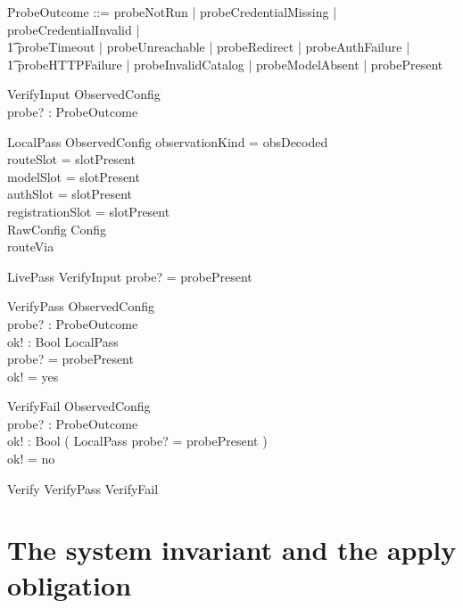 \documentclass{article}
\begin{document}
\begin{zed}
	ProbeOutcome ::= probeNotRun | probeCredentialMissing | probeCredentialInvalid | \\
	\t1 probeTimeout | probeUnreachable | probeRedirect | probeAuthFailure | \\
	\t1 probeHTTPFailure | probeInvalidCatalog | probeModelAbsent | probePresent
\end{zed}

\begin{schema}{VerifyInput}
	ObservedConfig \\
	probe? : ProbeOutcome
\end{schema}

\begin{schema}{LocalPass}
	ObservedConfig
	\where
	observationKind = obsDecoded \\
	routeSlot = slotPresent \\
	modelSlot = slotPresent \\
	authSlot = slotPresent \\
	registrationSlot = slotPresent \\
	\theta RawConfig \in Config \\
	\dom routeVia \neq \emptyset
\end{schema}

\begin{schema}{LivePass}
	VerifyInput
	\where
	probe? = probePresent
\end{schema}

\begin{schema}{VerifyPass}
	\Xi ObservedConfig \\
	probe? : ProbeOutcome \\
	ok! : Bool
	\where
	LocalPass \\
	probe? = probePresent \\
	ok! = yes
\end{schema}

\begin{schema}{VerifyFail}
	\Xi ObservedConfig \\
	probe? : ProbeOutcome \\
	ok! : Bool
	\where
	\lnot ( LocalPass \land probe? = probePresent ) \\
	ok! = no
\end{schema}

\begin{zed}
	Verify  VerifyPass \lor VerifyFail
\end{zed}

\section{The system invariant and the apply obligation}
\end{document}
